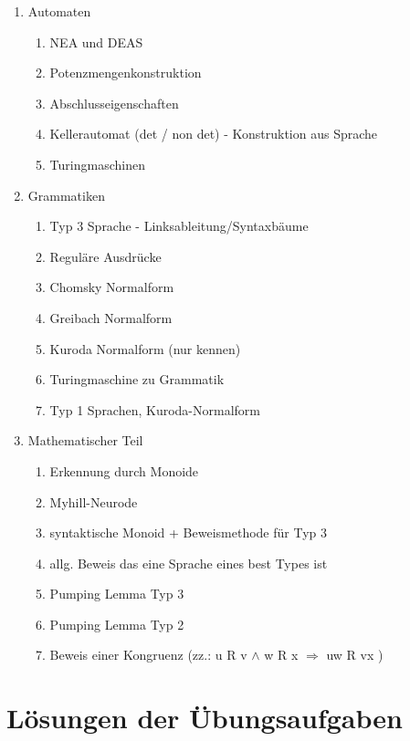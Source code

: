 \documentclass[12pt]{scrartcl}
\begin{document}
\begin{enumerate}
	\item Automaten
		\begin{enumerate}
			\item NEA und DEAS
			\item Potenzmengenkonstruktion
			\item Abschlusseigenschaften
			\item Kellerautomat (det / non det) - Konstruktion aus Sprache 
			\item Turingmaschinen 
		\end{enumerate}
		
	\item Grammatiken
		\begin{enumerate}
			\item Typ 3 Sprache - Linksableitung/Syntaxbäume
			\item Reguläre Ausdrücke
			\item Chomsky Normalform
			\item Greibach Normalform
			\item Kuroda Normalform (nur kennen)
			\item Turingmaschine zu Grammatik
			\item Typ 1 Sprachen, Kuroda-Normalform
		\end{enumerate}
		
		\item Mathematischer Teil
		\begin{enumerate}
			\item Erkennung durch Monoide 
			\item Myhill-Neurode
			\item syntaktische Monoid + Beweismethode für Typ 3
			\item allg. Beweis das eine Sprache eines best Types ist 
			\item Pumping Lemma Typ 3
			\item Pumping Lemma Typ 2
			\item Beweis einer Kongruenz (zz.: u R v $\land$ w R x $\Rightarrow$ uw R vx )
		\end{enumerate}
\end{enumerate}

\newpage

\section{Lösungen der Übungsaufgaben}
	
\end{document}
